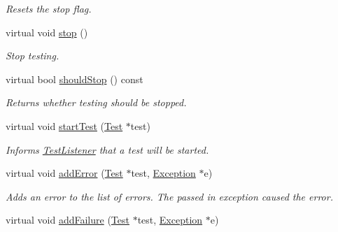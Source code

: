 \begin{DoxyCompactItemize}
\begin{DoxyCompactList}\small\item\em Resets the stop flag. \end{DoxyCompactList}\item 
\hypertarget{class_test_result_ada481ef1a01dfa7737a1bf019f352855}{virtual void \hyperlink{class_test_result_ada481ef1a01dfa7737a1bf019f352855}{stop} ()}\label{class_test_result_ada481ef1a01dfa7737a1bf019f352855}

\begin{DoxyCompactList}\small\item\em Stop testing. \end{DoxyCompactList}\item 
\hypertarget{class_test_result_a20831556df184132ea80836c196ed333}{virtual bool \hyperlink{class_test_result_a20831556df184132ea80836c196ed333}{should\+Stop} () const }\label{class_test_result_a20831556df184132ea80836c196ed333}

\begin{DoxyCompactList}\small\item\em Returns whether testing should be stopped. \end{DoxyCompactList}\item 
\hypertarget{class_test_result_a4acd959411284f57a26eefe4c79c30d3}{virtual void \hyperlink{class_test_result_a4acd959411284f57a26eefe4c79c30d3}{start\+Test} (\hyperlink{class_test}{Test} $\ast$test)}\label{class_test_result_a4acd959411284f57a26eefe4c79c30d3}

\begin{DoxyCompactList}\small\item\em Informs \hyperlink{class_test_listener}{Test\+Listener} that a test will be started. \end{DoxyCompactList}\item 
\hypertarget{class_test_result_a25b7f26ec9a52ea4e05b38a490d381c5}{virtual void \hyperlink{class_test_result_a25b7f26ec9a52ea4e05b38a490d381c5}{add\+Error} (\hyperlink{class_test}{Test} $\ast$test, \hyperlink{class_exception}{Exception} $\ast$e)}\label{class_test_result_a25b7f26ec9a52ea4e05b38a490d381c5}

\begin{DoxyCompactList}\small\item\em Adds an error to the list of errors. The passed in exception caused the error. \end{DoxyCompactList}\item 
\hypertarget{class_test_result_a648e7986cd583f7687dfaa88b5b2c080}{virtual void \hyperlink{class_test_result_a648e7986cd583f7687dfaa88b5b2c080}{add\+Failure} (\hyperlink{class_test}{Test} $\ast$test, \hyperlink{class_exception}{Exception} $\ast$e)}\label{class_test_result_a648e7986cd583f7687dfaa88b5b2c080}


\end{DoxyCompactItemize}
